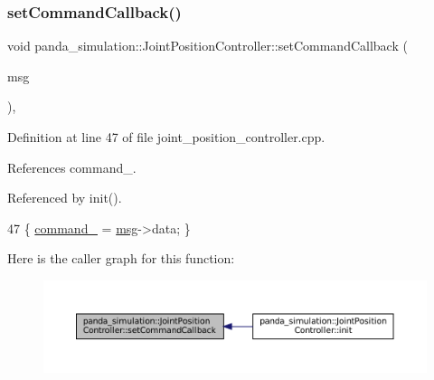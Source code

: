 \mbox{\label{classpanda__simulation_1_1JointPositionController_a047694491f9c2f2f2c241050eb4bc31b}} 
\subsubsection{\texorpdfstring{set\+Command\+Callback()}{setCommandCallback()}}
{\footnotesize\ttfamily void panda\+\_\+simulation\+::\+Joint\+Position\+Controller\+::set\+Command\+Callback (\begin{DoxyParamCaption}\item[{const std\+\_\+msgs\+::\+Float64\+Multi\+Array\+Const\+Ptr \&}]{msg }\end{DoxyParamCaption})\hspace{0.3cm}{\ttfamily [inline]}, {\ttfamily [private]}}



Definition at line 47 of file joint\+\_\+position\+\_\+controller.\+cpp.



References command\+\_\+.



Referenced by init().


\begin{DoxyCode}
47 \{ \hyperlink{classpanda__simulation_1_1JointPositionController_ab383d39c84291789c8b51c2b4ea08439}{command\_} = \hyperlink{namespacebattery__monitor__node_ab1920c64448816edd4064e494275fdff}{msg}->data; \}
\end{DoxyCode}
Here is the caller graph for this function\+:
\nopagebreak
\begin{figure}[H]
\begin{center}
\leavevmode
\includegraphics[width=350pt]{classpanda__simulation_1_1JointPositionController_a047694491f9c2f2f2c241050eb4bc31b_icgraph}
\end{center}
\end{figure}
\mbox{\label{classpanda__simulation_1_1JointPositionController_abf14b8f401436166eff03fff6a74da3c}} 
